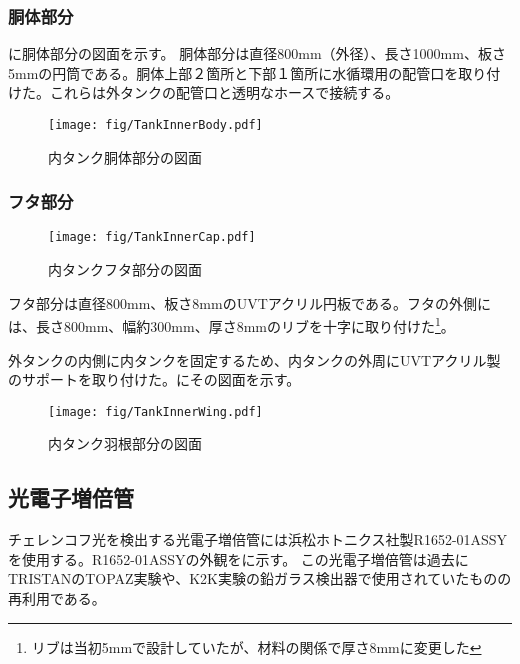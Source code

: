 \subsubsection{胴体部分}

に胴体部分の図面を示す。
胴体部分は直径800mm（外径）、長さ1000mm、板さ5mmの円筒である。胴体上部２箇所と下部１箇所に水循環用の配管口を取り付けた。これらは外タンクの配管口と透明なホースで接続する。


\begin{figure}[htbp]
\centering
\texttt{[image: fig/TankInnerBody.pdf]}
\caption[内タンク胴体部分の図面]{内タンク胴体部分の図面}
\label{TankInnerBody}
\end{figure}


\subsubsection{フタ部分}
\begin{figure}[htbp]
\centering
\texttt{[image: fig/TankInnerCap.pdf]}
\caption[内タンクフタ部分の図面]{内タンクフタ部分の図面}
\label{TankInnerCap}
\end{figure}

フタ部分は直径800mm、板さ8mmのUVTアクリル円板である。フタの外側には、長さ800mm、幅約300mm、厚さ8mmのリブを十字に取り付けた\footnote{リブは当初5mmで設計していたが、材料の関係で厚さ8mmに変更した}。

外タンクの内側に内タンクを固定するため、内タンクの外周にUVTアクリル製のサポートを取り付けた。にその図面を示す。
\begin{figure}[htb]
\centering
\texttt{[image: fig/TankInnerWing.pdf]}
\caption[内タンク羽根部分の図面]{内タンク羽根部分の図面}
\label{TankInnerWing}
\end{figure}
\fi%


\newpage
\subsection{光電子増倍管}
\label{PhotoTube}
チェレンコフ光を検出する光電子増倍管には浜松ホトニクス社製R1652-01ASSYを使用する。R1652-01ASSYの外観をに示す。
この光電子増倍管は過去にTRISTANのTOPAZ実験や、K2K実験の鉛ガラス検出器で使用されていたものの再利用である。

